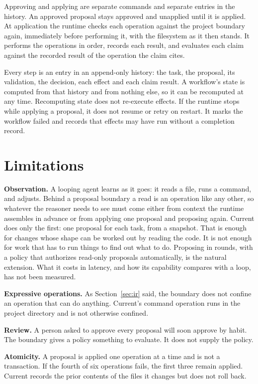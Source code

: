 \documentclass[10pt,letterpaper]{article}
\newcommand{\run}[1]{\textbf{#1}\hspace{0.45em}}
\begin{document}
Approving and applying are separate commands and separate entries in the history. An approved
proposal stays approved and unapplied until it is applied. At application the runtime checks
each operation against the project boundary again, immediately before performing it, with the
filesystem as it then stands. It performs the operations in order, records each result, and
evaluates each claim against the recorded result of the operation the claim cites.

Every step is an entry in an append-only history: the task, the proposal, its validation, the
decision, each effect and each claim result. A workflow's state is computed from that history
and from nothing else, so it can be recomputed at any time. Recomputing state does not
re-execute effects. If the runtime stops while applying a proposal, it does not resume or
retry on restart. It marks the workflow failed and records that effects may have run without
a completion record.

\section{Limitations}

\run{Observation.} A looping agent learns as it goes: it reads a file, runs a command, and
adjusts. Behind a proposal boundary a read is an operation like any other, so whatever the
reasoner needs to see must come either from context the runtime assembles in advance or from
applying one proposal and proposing again. Current does only the first: one proposal for each
task, from a snapshot. That is enough for changes whose shape can be worked out by reading the
code. It is not enough for work that has to run things to find out what to do. Proposing in
rounds, with a policy that authorizes read-only proposals automatically, is the natural
extension. What it costs in latency, and how its capability compares with a loop, has not been
measured.

\run{Expressive operations.} As Section~\ref{sec:ir} said, the boundary does not confine an operation
that can do anything. Current's command operation runs in the project directory and is not
otherwise confined.

\run{Review.} A person asked to approve every proposal will soon approve by habit. The
boundary gives a policy something to evaluate. It does not supply the policy.

\run{Atomicity.} A proposal is applied one operation at a time and is not a transaction. If
the fourth of six operations fails, the first three remain applied. Current records the prior
contents of the files it changes but does not roll back.
\end{document}
